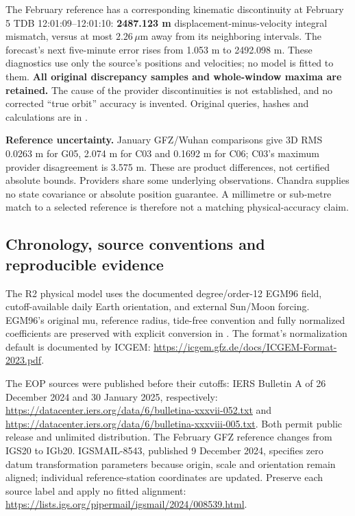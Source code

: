 The February reference has a corresponding kinematic discontinuity at
February 5 TDB 12:01:09--12:01:10: \textbf{2487.123 m} displacement-minus-velocity
integral mismatch, versus at most $2.26\,\mu\mathrm{m}$ away from its neighboring
intervals. The forecast's next five-minute error rises from 1.053 m to
2492.098 m. These diagnostics use only the source's positions and velocities;
no model is fitted to them. \textbf{All original discrepancy samples and
whole-window maxima are retained.} The cause of the provider discontinuities
is not established, and no corrected ``true orbit'' accuracy is invented.
Original queries, hashes and calculations are in
.

\textbf{Reference uncertainty.} January GFZ/Wuhan comparisons give 3D RMS
0.0263 m for G05, 2.074 m for C03 and 0.1692 m for C06; C03's maximum provider
disagreement is 3.575 m. These are product differences, not certified absolute
bounds. Providers share some underlying observations. Chandra supplies no
state covariance or absolute position guarantee. A millimetre or sub-metre
match to a selected reference is therefore not a matching physical-accuracy
claim.

\subsection{Chronology, source conventions and reproducible evidence}
\label{sec:orbit-provenance}
The R2 physical model uses the documented degree/order-12 EGM96 field,
cutoff-available daily Earth orientation, and external Sun/Moon forcing.
EGM96's original mu, reference radius, tide-free convention and fully normalized
coefficients are preserved with explicit conversion in
. The format's normalization default
is documented by ICGEM:
\url{https://icgem.gfz.de/docs/ICGEM-Format-2023.pdf}.

The EOP sources were published before their cutoffs: IERS Bulletin A of
26 December 2024 and 30 January 2025, respectively:
\url{https://datacenter.iers.org/data/6/bulletina-xxxvii-052.txt} and
\url{https://datacenter.iers.org/data/6/bulletina-xxxviii-005.txt}.
Both permit public release and unlimited distribution.
The February GFZ reference changes from IGS20 to IGb20. IGSMAIL-8543, published
9 December 2024, specifies zero datum transformation parameters because origin,
scale and orientation remain aligned; individual reference-station coordinates
are updated. Preserve each source label and apply no fitted alignment:
\url{https://lists.igs.org/pipermail/igsmail/2024/008539.html}.

